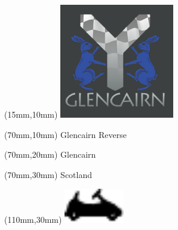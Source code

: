 \null\newpage
\begin{textblock*}{50mm}(15mm,10mm)%
\includegraphics[width=50mm]{LG/GLCN.png}
\end{textblock*}
\begin{textblock*}{130mm}(70mm,10mm)%
{\fontsize{20}{20}\selectfont Glencairn Reverse}\\
\end{textblock*}
\begin{textblock*}{120mm}(70mm,20mm)%
{\fontsize{16}{16}\selectfont Glencairn}\\
\end{textblock*}
\begin{textblock*}{120mm}(70mm,30mm)%
{\fontsize{12}{12}\selectfont Scotland}
\end{textblock*}
\begin{textblock*}{30mm}(110mm,30mm)%
\centering
\includegraphics[height=15mm]{icons/kart.pdf}
\end{textblock*}
